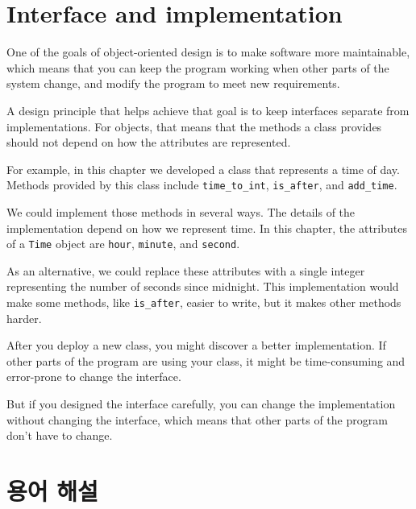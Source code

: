 \documentclass[10pt]{book}
\begin{document}
\section{Interface and implementation}

One of the goals of object-oriented design is to make software more
maintainable, which means that you can keep the program working when
other parts of the system change, and modify the program to meet new
requirements.

A design principle that helps achieve that goal is to keep
interfaces separate from implementations.  For objects, that means
that the methods a class provides should not depend on how the
attributes are represented.

For example, in this chapter we developed a class that represents
a time of day.  Methods provided by this class include
\verb"time_to_int", \verb"is_after", and \verb"add_time".

We could implement those methods in several ways.  The details of the
implementation depend on how we represent time.  In this chapter, the
attributes of a {\tt Time} object are {\tt hour}, {\tt minute}, and
{\tt second}.

As an alternative, we could replace these attributes with
a single integer representing the number of seconds
since midnight.  This implementation would make some methods,
like \verb"is_after", easier to write, but it makes other methods
harder.

After you deploy a new class, you might discover a better
implementation.  If other parts of the program are using your
class, it might be time-consuming and error-prone to change the
interface.  

But if you designed the interface carefully, you can
change the implementation without changing the interface, which
means that other parts of the program don't have to change.


\section{용어 해설}
\end{document}
